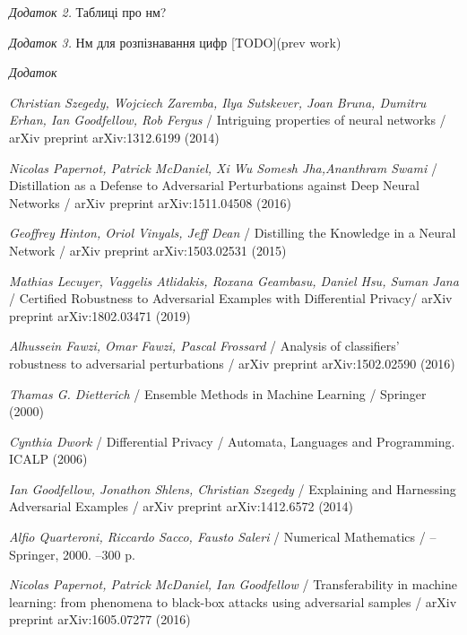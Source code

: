 \documentclass[14pt,a4paper]{extarticle}
\newcounter{e}
\numberwithin{equation}{section}
\numberwithin{figure}{section}
\begin{document}
 \textit{Додаток 2.} Таблиці про нм?
 
 \textit{Додаток 3.} Нм для розпізнавання цифр [TODO](prev work)
 
 \textit{Додаток}

 \newpage
 \thispagestyle{empty}
 \begin{thebibliography}{99}
	
	\textit{Christian Szegedy, Wojciech Zaremba, Ilya Sutskever, Joan Bruna, Dumitru Erhan, Ian Goodfellow, Rob Fergus} /
	Intriguing properties of neural networks /
	arXiv preprint arXiv:1312.6199 (2014)
	
	\textit{Nicolas Papernot, Patrick McDaniel, Xi Wu Somesh Jha,Ananthram Swami} /
	Distillation as a Defense to Adversarial Perturbations against Deep Neural Networks /
	arXiv preprint arXiv:1511.04508 (2016)
	
	\textit{Geoffrey Hinton, Oriol Vinyals, Jeff Dean} /
	Distilling the Knowledge in a Neural Network /
	arXiv preprint arXiv:1503.02531 (2015)
	
	\textit{Mathias Lecuyer, Vaggelis Atlidakis, Roxana Geambasu, Daniel Hsu, Suman Jana} /
	Certified Robustness to Adversarial Examples with Differential Privacy/
	arXiv preprint arXiv:1802.03471 (2019)
	
	\textit{Alhussein Fawzi, Omar Fawzi, Pascal Frossard} /
	Analysis of classifiers' robustness to adversarial perturbations /
	arXiv preprint arXiv:1502.02590 (2016)
	
	\textit{Thamas G. Dietterich} /
	Ensemble Methods in Machine Learning /
	Springer (2000)
	
	\textit{Cynthia Dwork} /
	Differential Privacy /
	Automata, Languages and Programming. ICALP (2006)
	
	\textit{Ian Goodfellow, Jonathon Shlens, Christian Szegedy} /
	Explaining and Harnessing Adversarial Examples /
	arXiv preprint arXiv:1412.6572 (2014)
	
	\textit{Alfio Quarteroni, Riccardo Sacco, Fausto Saleri} /
	Numerical Mathematics / --
	Springer, 2000. --300 p.
	
	\textit{Nicolas Papernot, Patrick McDaniel, Ian Goodfellow} /
	Transferability in machine learning: from phenomena to black-box attacks using adversarial samples /
	arXiv preprint arXiv:1605.07277 (2016)
	

\end{thebibliography}
\end{document}
